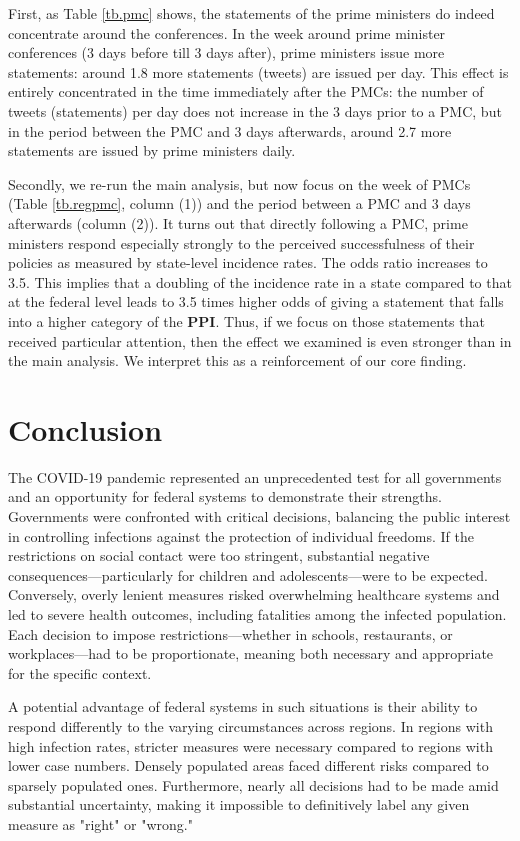 \documentclass[authoryear,12pt, 3p]{elsarticle} %
\theoremstyle{break}
\begin{document}
First, as Table \ref{tb.pmc} shows, the statements of the prime ministers do indeed concentrate around the conferences. In the week around prime minister conferences (3 days before till 3 days after), prime ministers issue more statements: around 1.8 more statements (tweets) are issued per day. This effect is entirely concentrated in the time immediately after the PMCs: the number of tweets (statements) per day does not increase in the 3 days prior to a PMC, but in the period between the PMC and 3 days afterwards, around 2.7 more statements are issued by prime ministers daily.



Secondly, we re-run the main analysis, but now focus on the week of PMCs (Table \ref{tb.regpmc}, column (1)) and the period between a PMC and 3 days afterwards (column (2)). It turns out that directly following a PMC, prime ministers respond especially strongly to the perceived successfulness of their policies as measured by state-level incidence rates. The odds ratio increases to 3.5. This implies that a doubling of the incidence rate in a state compared to that at the federal level leads to 3.5 times higher odds of giving a statement that falls into a higher category of the \textbf{PPI}. Thus, if we focus on those statements that received particular attention, then the effect we examined is even stronger than in the main analysis. We interpret this as a reinforcement of our core finding.

\section{Conclusion}\label{sec.conclusion}
The COVID-19 pandemic represented an unprecedented test for all governments and an opportunity for federal systems to demonstrate their strengths. Governments were confronted with critical decisions, balancing the public interest in controlling infections against the protection of individual freedoms. If the restrictions on social contact were too stringent, substantial negative consequences---particularly for children and adolescents---were to be expected. Conversely, overly lenient measures risked overwhelming healthcare systems and led to severe health outcomes, including fatalities among the infected population. Each decision to impose restrictions—whether in schools, restaurants, or workplaces—had to be proportionate, meaning both necessary and appropriate for the specific context.

A potential advantage of federal systems in such situations is their ability to respond differently to the varying circumstances across regions. In regions with high infection rates, stricter measures were necessary compared to regions with lower case numbers. Densely populated areas faced different risks compared to sparsely populated ones. Furthermore, nearly all decisions had to be made amid substantial uncertainty, making it impossible to definitively label any given measure as "right" or "wrong."
\end{document}
